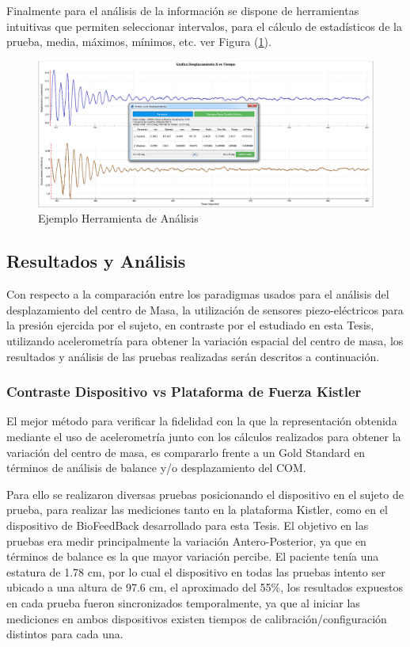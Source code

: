 \documentclass[12pt,a4paper]{article}
\begin{document}
Finalmente para el análisis de la información se dispone de herramientas intuitivas que permiten seleccionar intervalos, para el cálculo de estadísticos de la prueba, media, máximos, mínimos, etc. ver Figura (\ref{fig:analsisGraficos}).

\begin{figure}[H]
	\centering
	\includegraphics[scale=0.3]{images/analisisGraficos}
	\caption{Ejemplo Herramienta de Análisis}
	\label{fig:analsisGraficos}
\end{figure}

\newpage
\subsection{Resultados y Análisis}
Con respecto a la comparación entre los paradigmas usados para el análisis del desplazamiento del centro de Masa, la utilización de sensores piezo-eléctricos para la presión ejercida por el sujeto, en contraste por el estudiado en esta Tesis, utilizando acelerometría para obtener la variación espacial del centro de masa, los resultados y análisis de las pruebas realizadas serán descritos a continuación.

\subsubsection{Contraste Dispositivo vs Plataforma de Fuerza Kistler}

El mejor método para verificar la fidelidad con la que la representación obtenida mediante el uso de acelerometría junto con los cálculos realizados para obtener la variación del centro de masa, es compararlo frente a un Gold Standard en términos de análisis de balance y/o desplazamiento del COM.

Para ello se realizaron diversas pruebas posicionando el dispositivo en el sujeto de prueba, para realizar las mediciones tanto en la plataforma Kistler, como en el dispositivo de BioFeedBack desarrollado para esta Tesis.
El objetivo en las pruebas era medir principalmente la variación Antero-Posterior, ya que en términos de balance es la que mayor variación percibe.
El paciente tenía una estatura de 1.78 cm, por lo cual el dispositivo en todas las pruebas intento ser ubicado a una altura de 97.6 cm, el aproximado del 55\%, los resultados expuestos en cada prueba fueron sincronizados temporalmente, ya que al iniciar las mediciones en ambos dispositivos existen tiempos de calibración/configuración distintos para cada una.
\end{document}
